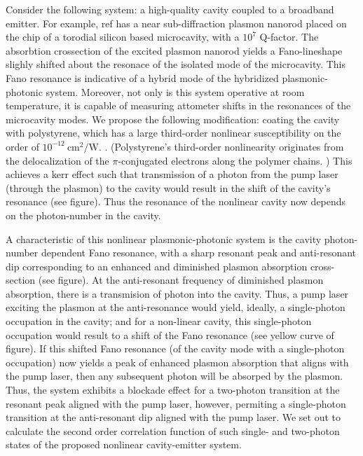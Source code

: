 \documentclass[12pt]{article}
\begin{document}
Consider the following system: a high-quality cavity coupled to a broadband emitter. 
For example, ref \cite{pan2019elucidating} has a near sub-diffraction plasmon nanorod 
placed on the chip of a torodial silicon based microcavity, with a $10^{7}$ Q-factor. 
The absorbtion crossection of the excited plasmon nanorod yields a Fano-lineshape slighly 
shifted about the resonace of the isolated mode of the microcavity. This Fano resonance 
is indicative of a hybrid mode of the hybridized plasmonic-photonic system. Moreover, 
not only is this system operative at room temperature, it is capable of measuring 
attometer shifts in the resonances of the microcavity modes. We propose the following 
modification: coating the cavity with polystyrene, which has a large third-order nonlinear susceptibility on the order of $10^{−12} \:\mathrm{cm}^2/\mathrm{W}$. 
\cite{qin2010design, liu200910}. (Polystyrene's third-order nonlinearity originates 
from the delocalization of the $\pi$-conjugated electrons along the polymer chains. 
\cite{krausz1989optical, wong1991studies}) This achieves a kerr effect such that 
transmission of a photon from the pump laser (through the plasmon) to the cavity would 
result in the shift of the cavity's resonance (see figure). Thus the resonance of the 
nonlinear cavity now depends on the photon-number in the cavity.

A characteristic of this nonlinear plasmonic-photonic system is the cavity photon-number 
dependent Fano resonance, with a sharp resonant peak and anti-resonant dip corresponding 
to an enhanced and diminished plasmon absorption cross-section (see figure). At the 
anti-resonant frequency of diminished plasmon absorption, there is a transmision of 
photon into the cavity. Thus, a pump laser exciting the plasmon at the anti-resonance 
would yield, ideally, a single-photon occupation in the cavity; and for a non-linear 
cavity, this single-photon occupation would result to a shift of the Fano resonance
(see yellow curve of figure). If this shifted Fano resonance (of the cavity mode with 
a single-photon occupation) now yields a peak of enhanced plasmon absorption that aligns 
with the pump laser, then any subsequent photon will be absorped by the plasmon. Thus, 
the system exhibits a blockade effect for a two-photon transition at the resonant peak
aligned with the pump laser, however, permiting a single-photon transition at the 
anti-resonant dip aligned with the pump laser. We set out to calculate the second order 
correlation function of such single- and two-photon states of the proposed nonlinear 
cavity-emitter system.
\end{document}
